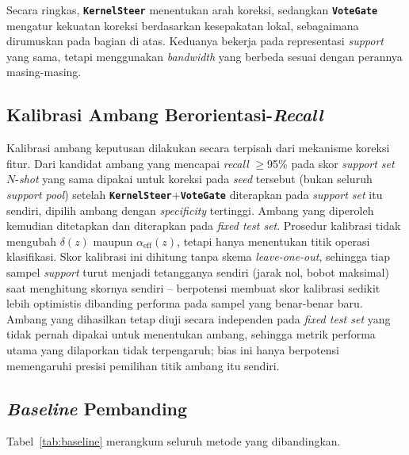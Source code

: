 \documentclass[conference]{IEEEtran}
\newcommand{\nama}[1]{\textbf{\texttt{#1}}}
\begin{document}
Secara ringkas, \nama{KernelSteer} menentukan arah koreksi, sedangkan \nama{VoteGate} mengatur kekuatan koreksi berdasarkan kesepakatan lokal, sebagaimana dirumuskan pada bagian di atas. Keduanya bekerja pada representasi \textit{support} yang sama, tetapi menggunakan \textit{bandwidth} yang berbeda sesuai dengan perannya masing-masing.

\subsection{Kalibrasi Ambang Berorientasi-\textit{Recall}}
Kalibrasi ambang keputusan dilakukan secara terpisah dari mekanisme koreksi fitur. Dari kandidat ambang yang mencapai \textit{recall} $\geq$95\% pada skor \textit{support set} $N$-\textit{shot} yang sama dipakai untuk koreksi pada \textit{seed} tersebut (bukan seluruh \textit{support pool}) setelah \nama{KernelSteer}+\nama{VoteGate} diterapkan pada \textit{support set} itu sendiri, dipilih ambang dengan \textit{specificity} tertinggi. Ambang yang diperoleh kemudian ditetapkan dan diterapkan pada \textit{fixed test set}. Prosedur kalibrasi tidak mengubah $\delta(z)$ maupun $\alpha_{\text{eff}}(z)$, tetapi hanya menentukan titik operasi klasifikasi. Skor kalibrasi ini dihitung tanpa skema \textit{leave-one-out}, sehingga tiap sampel \textit{support} turut menjadi tetangganya sendiri (jarak nol, bobot maksimal) saat menghitung skornya sendiri -- berpotensi membuat skor kalibrasi sedikit lebih optimistis dibanding performa pada sampel yang benar-benar baru. Ambang yang dihasilkan tetap diuji secara independen pada \textit{fixed test set} yang tidak pernah dipakai untuk menentukan ambang, sehingga metrik performa utama yang dilaporkan tidak terpengaruh; bias ini hanya berpotensi memengaruhi presisi pemilihan titik ambang itu sendiri.

\subsection{\textit{Baseline} Pembanding}
Tabel~\ref{tab:baseline} merangkum seluruh metode yang dibandingkan.
\end{document}
